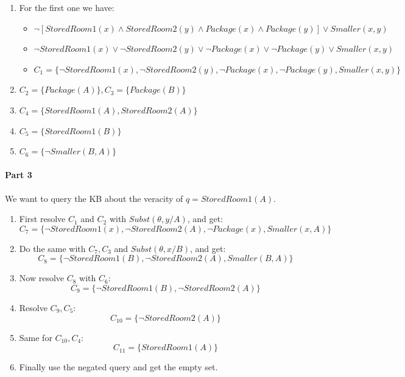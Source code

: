 \documentclass[10pt,a4paper]{article}
\newcommand{\braces}[1]{%
  \lbrace{#1}\rbrace}
\newcommand{\subst}[1]{Subst(\theta,#1)}
\begin{document}
\begin{enumerate}
\item For the first one we have:

	\begin{itemize}
	\item $\neg[StoredRoom1(x) \wedge StoredRoom2(y) \wedge Package(x) \wedge Package(y)] \vee Smaller(x,y)$
	\item $\neg StoredRoom1(x) \vee \neg StoredRoom2(y) \vee \neg Package(x) \vee \neg Package(y) \vee Smaller(x,y)$
	\item $C_1=\braces{\neg StoredRoom1(x) , \neg StoredRoom2(y) , \neg Package(x) , \neg Package(y) , Smaller(x,y)}$
	\end{itemize}
\item $C_2=\braces{Package(A)},C_3=\braces{Package(B)}$
\item $C_4=\braces{StoredRoom1(A), StoredRoom2(A)}$
\item $C_5=\braces{StoredRoom1(B)}$
\item $C_6=\braces{\neg Smaller(B,A)}$
\end{enumerate}

\paragraph{Part 3}
We want to query the KB  about the veracity of $q=StoredRoom1(A)$.

\begin{enumerate}
\item First resolve $C_1$ and $C_2$ with $\subst{y/A}$, and get:
\[C_7=\braces{\neg StoredRoom1(x) , \neg StoredRoom2(A) , \neg Package(x)  , Smaller(x,A)}\]

\item Do the same with $C_7,C_3$ and $\subst{x/B}$, and get: 
\[C_8=\braces{\neg StoredRoom1(B) , \neg StoredRoom2(A) , Smaller(B,A)}\]

\item Now resolve $C_8$ with $C_6$:
\[C_9=\braces{\neg StoredRoom1(B) , \neg StoredRoom2(A)}\]

\item Resolve $C_9, C_5$:
\[C_{10}=\braces{\neg StoredRoom2(A)}\]

\item Same for $C_{10},C_4$:
\[C_{11}=\braces{StoredRoom1(A)}\]

\item Finally use the negated query and get the empty set.
\end{enumerate}
\end{document}

